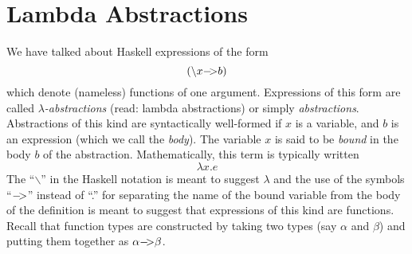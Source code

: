 \documentclass[11pt]{article}
\begin{document}

\section{Lambda Abstractions}

We have talked about Haskell expressions of the form
\[(\backslash{}x {\tt{-\!\!\!>}}  b)\]
which denote (nameless) functions of one argument.  Expressions of this form
are called {\em{$\lambda$-abstractions}} (read: lambda abstractions) or simply
{\em{abstractions}}.  Abstractions of this kind are syntactically well-formed
if $x$ is a variable, and $b$ is an expression (which we call the {\em{body}}).
The variable $x$ is said to be {\em{bound}} in the body $b$ of the abstraction.
Mathematically, this term is typically written
\[\lambda{}x.e\]
The ``$\backslash$'' in the Haskell notation is meant to suggest $\lambda$ and
the use of the symbols ``${\tt{-\!\!\!>}}$'' instead of ``.'' for separating the name of
the bound variable from the body of the definition is meant to suggest that
expressions of this kind are functions.  Recall that function types are
constructed by taking two types (say $\alpha$ and $\beta$) and putting them
together as $\alpha{\tt{-\!\!\!>}}\beta$.

\smallsection
\end{document}
